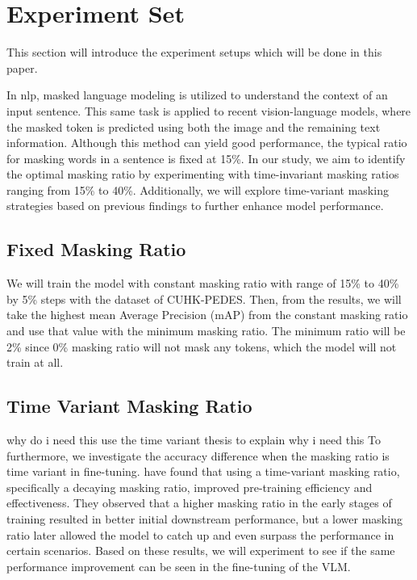 \section{Experiment Set}
This section will introduce the experiment setups which will be done in this paper.

In \acrshort{nlp}, masked language modeling is utilized to understand the context of an input sentence. This same task is applied to recent vision-language models, where the masked token is predicted using both the image and the remaining text information. Although this method can yield good performance, the typical ratio for masking words in a sentence is fixed at 15\%. 
In our study, we aim to identify the optimal masking ratio by experimenting with time-invariant masking ratios ranging from 15\% to 40\%. Additionally, we will explore time-variant masking strategies based on previous findings to further enhance model performance.

\subsection{Fixed Masking Ratio}
We will train the model with constant masking ratio with range of 15\% to 40\% by 5\% steps with the dataset of CUHK-PEDES. Then, from the results, we will take the highest mean Average Precision (mAP) from the constant masking ratio and use that value with the minimum masking ratio. The minimum ratio will be 2\% since 0\% masking ratio will not mask any tokens, which the model will not train at all. 


\subsection{Time Variant Masking Ratio}

{\color{red} why do i need this}
use the time variant thesis to explain why i need this
To furthermore, we investigate the accuracy difference when the masking ratio is time variant in fine-tuning.
\cite{yang2023learningbettermaskingbetter} have found that using a time-variant masking ratio, specifically a decaying masking ratio, improved pre-training efficiency and effectiveness. They observed that a higher masking ratio in the early stages of training resulted in better initial downstream performance, but a lower masking ratio later allowed the model to catch up and even surpass the performance in certain scenarios. Based on these results, we will experiment to see if the same performance improvement can be seen in the fine-tuning of the VLM.

